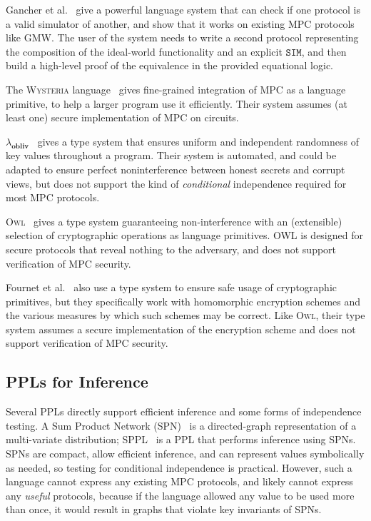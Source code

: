 \documentclass[acmlarge, manuscript, screen, review, anonymous, table]{acmart}
\begin{document}
Gancher et al.~\cite{gancher2023core} %
give a powerful language system that can check if one protocol is a valid simulator of another,
and show that it works on existing MPC protocols like GMW.
The user of the system needs to write a second protocol
representing the composition of the ideal-world functionality and an explicit $\mathtt{SIM}$,
and then build a high-level proof of the equivalence in the provided equational logic.

The \textsc{Wysteria} language~\cite{rastogi2014wysteria} %
gives fine-grained integration of MPC as a language primitive, to help a larger program use it efficiently.
Their system assumes (at least one) secure implementation of MPC on circuits.

$\lambda_\textbf{obliv}$~\cite{darais2019language} %
gives a type system that ensures uniform and independent randomness of key values throughout a program.
Their system is automated, and could be adapted to ensure perfect noninterference between honest secrets and corrupt views,
but does not support the kind of \emph{conditional} independence required for most MPC protocols.

\textsc{Owl}~\cite{gancher2023owl} %
gives a type system guaranteeing non-interference with an (extensible) selection of cryptographic operations as language primitives.
OWL is designed for secure protocols that reveal nothing to the adversary, and does not support verification of MPC security.

Fournet et al.~\cite{fournet2011information} %
also use a type system to ensure safe usage of cryptographic primitives,
but they specifically work with homomorphic encryption schemes and the various measures by which such schemes may be correct.
Like \textsc{Owl}, their type system assumes a secure implementation of the encryption scheme and does not support verification of MPC security.

\subsection{PPLs for Inference}

Several PPLs directly support efficient inference and some forms of independence testing.
A Sum Product Network (SPN)~\cite{poon2011sum} is a directed-graph representation of a multi-variate distribution;
SPPL~\cite{saad2021sppl} is a PPL that performs inference using SPNs.
SPNs are compact, allow efficient inference, and can represent values symbolically as needed,
so testing for conditional independence is practical.
However, such a language cannot express any existing MPC protocols, and likely cannot express any \emph{useful} protocols,
because if the language allowed any value to be used more than once, it would result in graphs that violate key invariants of SPNs.
\end{document}
